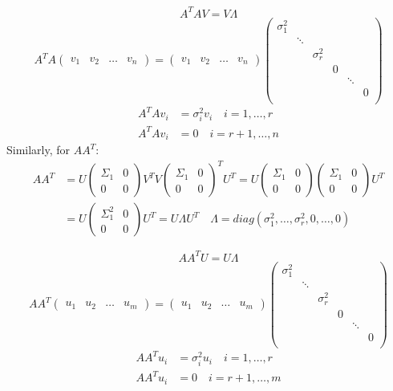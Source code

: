 \documentclass[a4paper, 12pt]{article}
\begin{document}
$$A^TAV = V\Lambda$$
$$
A^TA \begin{pmatrix} v_1 & v_2 & \ldots & v_n \end{pmatrix}
= \begin{pmatrix} v_1 & v_2 & \ldots & v_n \end{pmatrix}
\begin{pmatrix}
    \sigma_1^2 \\
    & \ddots \\
    & & \sigma_r^2 \\
    & & & 0 \\
    & & & & \ddots \\
    & & & & & 0 \\
\end{pmatrix}
$$
$$
\begin{aligned}
    A^TAv_i &= \sigma_i^2 v_i \quad i=1, \ldots, r \\
    A^TAv_i &= 0 \quad i=r+1, \ldots, n
\end{aligned}
$$
Similarly, for $AA^T$:
\[ 
    \begin{aligned}
        AA^T &= U\begin{pmatrix} \Sigma_1 & 0 \\ 0 & 0 \end{pmatrix} V^T V \begin{pmatrix} \Sigma_1 & 0 \\ 0 & 0 \end{pmatrix}^T U^T = U \begin{pmatrix} \Sigma_1 & 0 \\ 0 & 0 \end{pmatrix} \begin{pmatrix} \Sigma_1 & 0 \\ 0 & 0 \end{pmatrix} U^T\\
        &= U \begin{pmatrix} \Sigma_1^2 & 0 \\ 0 & 0 \end{pmatrix} U^T = U\Lambda U^T \quad \Lambda = diag(\sigma_1^2, \ldots, \sigma_r^2, 0, \ldots, 0)
    \end{aligned}
\]

$$AA^TU = U\Lambda$$
$$
AA^T \begin{pmatrix} u_1 & u_2 & \ldots & u_m \end{pmatrix}
= \begin{pmatrix} u_1 & u_2 & \ldots & u_m \end{pmatrix}
\begin{pmatrix}
    \sigma_1^2 \\
    & \ddots \\
    & & \sigma_r^2 \\
    & & & 0 \\
    & & & & \ddots \\
    & & & & & 0 \\
\end{pmatrix}
$$
$$
\begin{aligned}
    AA^Tu_i &= \sigma_i^2 u_i \quad i=1, \ldots, r \\
    AA^Tu_i &= 0 \quad i=r+1, \ldots, m
\end{aligned}
$$
\end{document}
